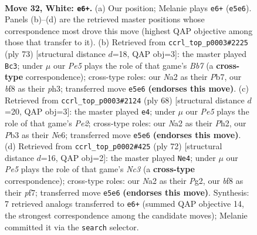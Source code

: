 \documentclass[11pt]{article}
\begin{document}
\clearpage

\begin{figure}[p]\centering
\begin{subfigure}{0.46\textwidth}\centering
\resizebox{\linewidth}{!}{%
\newchessgame
\chessboard[
  setfen={4nb2/3k4/8/2pPP1p1/8/1P1K4/N7/8 w - - 1 32},
  showmover=false,
  pgfstyle=straightmove, color=movearrow, markmove={e5-e6}
]}
\caption{}
\end{subfigure}\hfill
\begin{subfigure}{0.46\textwidth}\centering
\resizebox{\linewidth}{!}{%
\newchessgame
\chessboard[
  setfen={6k1/1p6/7p/P4p2/8/3NK2P/1b4P1/8 b - - 1 37},
  showmover=false,
  pgfstyle=straightmove, color=movearrow, markmove={b2-c3}
]}
\caption{}
\end{subfigure}
\\[4pt]
\begin{subfigure}{0.46\textwidth}\centering
\resizebox{\linewidth}{!}{%
\newchessgame
\chessboard[
  setfen={8/7p/1p2N3/8/8/1k6/1Pn1PK1P/8 w - - 1 35},
  showmover=false,
  pgfstyle=straightmove, color=movearrow, markmove={e2-e4}
]}
\caption{}
\end{subfigure}\hfill
\begin{subfigure}{0.46\textwidth}\centering
\resizebox{\linewidth}{!}{%
\newchessgame
\chessboard[
  setfen={8/1pn2p2/2k5/5P1p/8/2N1K2P/6P1/8 w - - 3 37},
  showmover=false,
  pgfstyle=straightmove, color=movearrow, markmove={c3-e4}
]}
\caption{}
\end{subfigure}
\caption{\textbf{Move 32, White: \texttt{e6+}.} (a) Our position; Melanie plays \texttt{e6+} (\texttt{e5e6}). Panels (b)--(d) are the retrieved master positions whose correspondence most drove this move (highest QAP objective among those that transfer to it). (b) Retrieved from \texttt{ccrl\_top\_p0003\#2225} (ply 73) [structural distance $d$=18, QAP obj=3]: the master played \texttt{Bc3}; under $\mu$ our \emph{Pe5} plays the role of that game's \emph{Bb7} (a \textbf{cross-type} correspondence); cross-type roles: our \emph{N}a2 as their \emph{P}b7, our \emph{b}f8 as their \emph{p}h3; transferred move \texttt{e5e6} \textbf{(endorses this move)}. (c) Retrieved from \texttt{ccrl\_top\_p0003\#2124} (ply 68) [structural distance $d$=20, QAP obj=3]: the master played \texttt{e4}; under $\mu$ our \emph{Pe5} plays the role of that game's \emph{Pe2}; cross-type roles: our \emph{N}a2 as their \emph{P}h2, our \emph{P}b3 as their \emph{N}e6; transferred move \texttt{e5e6} \textbf{(endorses this move)}. (d) Retrieved from \texttt{ccrl\_top\_p0002\#425} (ply 72) [structural distance $d$=16, QAP obj=2]: the master played \texttt{Ne4}; under $\mu$ our \emph{Pe5} plays the role of that game's \emph{Nc3} (a \textbf{cross-type} correspondence); cross-type roles: our \emph{N}a2 as their \emph{P}g2, our \emph{b}f8 as their \emph{p}f7; transferred move \texttt{e5e6} \textbf{(endorses this move)}. Synthesis: 7 retrieved analogs transferred to \texttt{e6+} (summed QAP objective 14, the strongest correspondence among the candidate moves); Melanie committed it via the \texttt{search} selector.}
\label{fig:thought-m62}
\end{figure}
\end{document}

